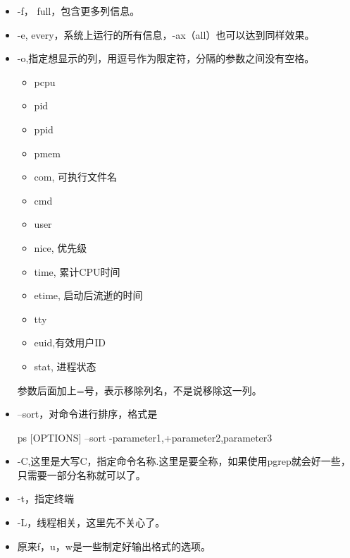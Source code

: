 \begin{itemize}

\item -f， full，包含更多列信息。

\item -e, every，系统上运行的所有信息，-ax（all）也可以达到同样效果。


\item -o,指定想显示的列，用逗号作为限定符，分隔的参数之间没有空格。

\begin{itemize}
\item pcpu
\item pid
\item ppid
\item pmem
\item com, 可执行文件名
\item cmd
\item user
\item nice, 优先级
\item time, 累计CPU时间
\item etime, 启动后流逝的时间
\item tty
\item euid,有效用户ID
\item stat, 进程状态
\end{itemize}

参数后面加上=号，表示移除列名，不是说移除这一列。





\item --sort，对命令进行排序，格式是

\begin{Bash}
ps [OPTIONS] --sort -parameter1,+parameter2,parameter3
\end{Bash}


\item -C,这里是大写C，指定命令名称.这里是要全称，如果使用pgrep就会好一些，只需要一部分名称就可以了。


\item -t，指定终端

\item -L，线程相关，这里先不关心了。

\item 原来f，u，w是一些制定好输出格式的选项。





\end{itemize}

